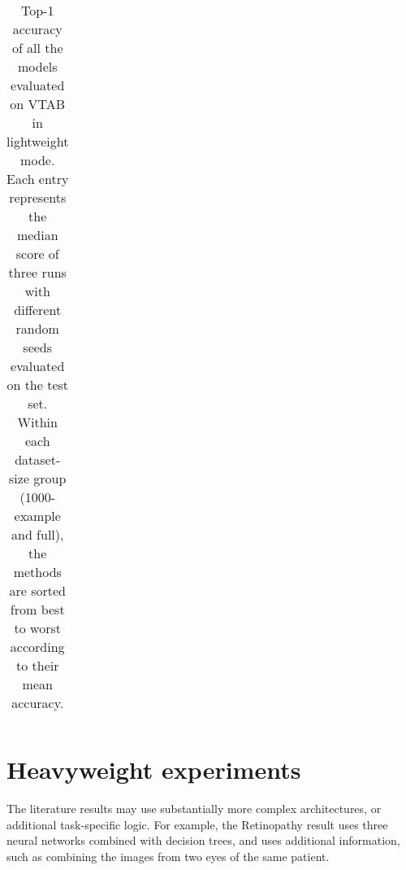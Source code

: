 \documentclass{article}
\begin{document}
\begin{table}[h]
\begin{tabularx}{\linewidth}{p{10pt}p{1.6cm}!{\color{lightgray}\vline} CCCCCCC!{\color{lightgray}\vline}CCCC!{\color{lightgray}\vline}CCCCCCCC!{\color{lightgray}\vline}C}
\bottomrule
\end{tabularx}
 \caption{Top-1 accuracy of all the models evaluated on VTAB in lightweight mode.
Each entry represents the median score of three runs with different random seeds evaluated on the test set. 
Within each dataset-size group (1000-example and full), the methods are sorted from best to worst according to their mean accuracy.}
\label{tab:lightweight}
\end{table}


\clearpage
\section{Heavyweight experiments\label{app:heavyweight}}

The literature results may use substantially more complex architectures, or additional task-specific logic.
For example, the Retinopathy result uses three neural networks combined with decision trees, and uses additional information, such as combining the images from two eyes of the same patient.
\end{document}
